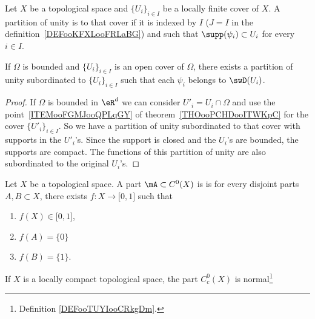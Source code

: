 \begin{definition}
	Let \( X\) be a topological space and \( \{ U_i \}_{i\in I}\) be a locally finite cover of \( X\). A partition of unity is  to that cover if it is indexed by \( I\) (\( J=I\) in the definition~\ref{DEFooKFXLooFRLaBG}) and such that \( \supp(\psi_i)\subset U_i\) for every \( i\in I\).
\end{definition}

\begin{corollary}  \label{CORooMSWPooCxvuhm}
	If \( \Omega\) is bounded and \( \{U_i \}_{i\in I}\) is an open cover of \( \Omega\), there exists a partition of unity subordinated to \( \{ U_i \}_{i\in I}\) such that each \( \psi_i\) belongs to \( \swD(U_i)\).
\end{corollary}

\begin{proof}
	If \( \Omega\) is bounded in \( \eR^d\) we can consider \( U'_i=U_i\cap \Omega\) and use the point~\ref{ITEMooFGMJooQPLqGY} of theorem~\ref{THOooPCHDooITWKpC} for the cover \( \{ U'_i \}_{i\in I}\). So we have a partition of unity subordinated to that cover with supports in the \( U'_i\)'s. Since the support is closed and the \( U_i\)'s are bounded, the supports are compact. The functions of this partition of unity are also subordinated to the original \( U_i\)'s.
\end{proof}

\begin{definition}        \label{DEFooTUYIooCRkgDm}
	Let \( X\) be a topological space. A part \( \mA\subset C^0(X)\) is  is for every disjoint parts \( A,B\subset X\), there exists \( f\colon X\to \mathopen[ 0 , 1 \mathclose]\) such that
	\begin{enumerate}
		\item
		      \( f(X)\in\mathopen[ 0 , 1 \mathclose]\),
		\item
		      \( f(A)=\{ 0 \}\)
		\item
		      \( f(B)=\{ 1 \}\).
	\end{enumerate}
\end{definition}

\begin{lemma}       \label{LEMooDZGCooIGFXnA}
	If \( X\) is a locally compact topological space, the part \( C^0_c(X)\) is normal\footnote{Definition \ref{DEFooTUYIooCRkgDm}.}
\end{lemma}

